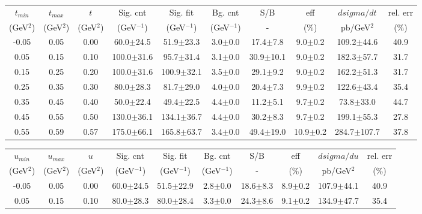 \begin{landscape}
\begin{table}[hbpt]
  \begin{center}
    \begin{tabular}{|c|c|c|c|c|c|c|c|c|c|}
      \hline
      $t_{min}$ & $t_{max}$ & $t$ & Sig. cnt & Sig. fit & Bg. cnt & S/B & eff & $dsigma/dt$ & rel. err \\ 
      (GeV$^{2}$) & (GeV$^{2}$) & (GeV$^{2}$) & (GeV$^{-1}$) & (GeV$^{-1}$) & (GeV$^{-1}$) & - & (\%) & pb/GeV$^{2}$ & (\%) \\	
      \hline
 -0.05 & 0.05 & 0.00 & 60.0$\pm$24.5 &  51.9$\pm$23.3 &  3.0$\pm$0.0 &  17.4$\pm$7.8 & 9.0$\pm$0.2 &  109.2$\pm$44.6 & 40.9 \\ 
 \hline 
 0.05 & 0.15 & 0.10 & 100.0$\pm$31.6 &  95.7$\pm$31.4 &  3.1$\pm$0.0 &  30.9$\pm$10.1 & 9.0$\pm$0.2 &  182.3$\pm$57.7 & 31.7 \\ 
 \hline 
 0.15 & 0.25 & 0.20 & 100.0$\pm$31.6 &  100.9$\pm$32.1 &  3.5$\pm$0.0 &  29.1$\pm$9.2 & 9.0$\pm$0.2 &  162.2$\pm$51.3 & 31.7 \\ 
 \hline 
 0.25 & 0.35 & 0.30 & 80.0$\pm$28.3 &  81.7$\pm$29.0 &  4.0$\pm$0.0 &  20.4$\pm$7.3 & 9.9$\pm$0.2 &  122.6$\pm$43.4 & 35.4 \\ 
 \hline 
 0.35 & 0.45 & 0.40 & 50.0$\pm$22.4 &  49.4$\pm$22.5 &  4.4$\pm$0.0 &  11.2$\pm$5.1 & 9.7$\pm$0.2 &  73.8$\pm$33.0 & 44.7 \\ 
 \hline 
 0.45 & 0.55 & 0.50 & 130.0$\pm$36.1 &  134.1$\pm$36.7 &  4.4$\pm$0.0 &  30.2$\pm$8.3 & 9.7$\pm$0.2 &  199.1$\pm$55.3 & 27.8 \\ 
 \hline 
 0.55 & 0.59 & 0.57 & 175.0$\pm$66.1 &  165.8$\pm$63.7 &  3.4$\pm$0.0 &  49.4$\pm$19.0 & 10.9$\pm$0.2 &  284.7$\pm$107.7 & 37.8 \\ 
 \hline 
    \end{tabular}
    \begin{tabular}{|c|c|c|c|c|c|c|c|c|c|}
      \hline
      $u_{min}$ & $u_{max}$ & $u$ & Sig. cnt & Sig. fit & Bg. cnt & S/B & eff & $dsigma/du$ & rel. err \\ 
      (GeV$^{2}$) & (GeV$^{2}$) & (GeV$^{2}$) & (GeV$^{-1}$) & (GeV$^{-1}$) & (GeV$^{-1}$) & - & (\%) & pb/GeV$^{2}$ & (\%) \\	
      \hline
 -0.05 & 0.05 & 0.00 & 60.0$\pm$24.5 &  51.5$\pm$22.9 &  2.8$\pm$0.0 &  18.6$\pm$8.3 & 8.9$\pm$0.2 &  107.9$\pm$44.1 & 40.9 \\ 
 \hline 
 0.05 & 0.15 & 0.10 & 80.0$\pm$28.3 &  80.0$\pm$28.4 &  3.3$\pm$0.0 &  24.3$\pm$8.6 & 9.1$\pm$0.2 &  134.9$\pm$47.7 & 35.4 \\ 

\end{tabular}
\end{center}
\end{table}
\end{landscape}
